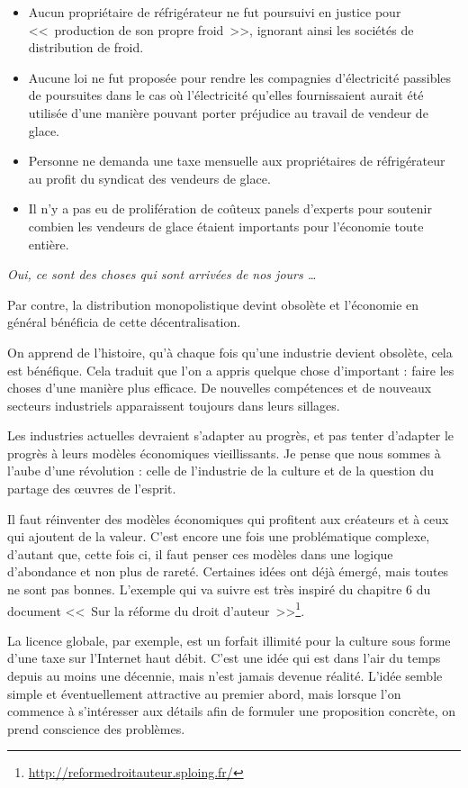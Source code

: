 \begin{itemize}
\item Aucun propriétaire de réfrigérateur ne fut poursuivi en justice pour <<~production de son propre froid~>>, ignorant ainsi les sociétés de distribution de froid.
\item Aucune loi ne fut proposée pour rendre les compagnies d'électricité passibles de poursuites dans le cas où l'électricité qu'elles fournissaient aurait été utilisée d'une manière pouvant porter préjudice au travail de vendeur de glace.
\item Personne ne demanda une taxe mensuelle aux propriétaires de réfrigérateur au profit du syndicat des vendeurs de glace.
\item Il n'y a pas eu de prolifération de coûteux panels d'experts pour soutenir combien les vendeurs de glace étaient importants pour l'économie toute entière.
\end{itemize}

\textit{Oui, ce sont des choses qui sont arrivées de nos jours \dots{}}

Par contre, la distribution monopolistique devint obsolète et l'économie en général bénéficia de cette décentralisation.

On apprend de l'histoire, qu'à chaque fois qu'une industrie devient obsolète, cela est bénéfique.
Cela traduit que l'on a appris quelque chose d'important : faire les choses d'une manière plus efficace.
De nouvelles compétences et de nouveaux secteurs industriels apparaissent toujours dans leurs sillages.

Les industries actuelles devraient s'adapter au progrès, et pas tenter d'adapter le progrès à leurs modèles économiques vieillissants.
Je pense que nous sommes à l'aube d'une révolution : celle de l'industrie de la culture et de la question du partage des œuvres de l'esprit.

Il faut réinventer des modèles économiques qui profitent aux créateurs et à ceux qui ajoutent de la valeur.
C'est encore une fois une problématique complexe, d'autant que, cette fois ci, il faut penser ces modèles dans une logique d'abondance et non plus de rareté.
Certaines idées ont déjà émergé, mais toutes ne sont pas bonnes.
L'exemple qui va suivre est très inspiré du chapitre 6 du document <<~Sur la réforme du droit d'auteur~>>\footnote{\url{http://reformedroitauteur.sploing.fr/}}.

La licence globale, par exemple, est un forfait illimité pour la culture sous forme d'une taxe sur l'Internet haut débit.
C'est une idée qui est dans l'air du temps depuis au moins une décennie, mais n'est jamais devenue réalité.
L'idée semble simple et éventuellement attractive au premier abord, mais lorsque l'on commence à s'intéresser aux détails afin de formuler une proposition concrète, on prend conscience des problèmes.

